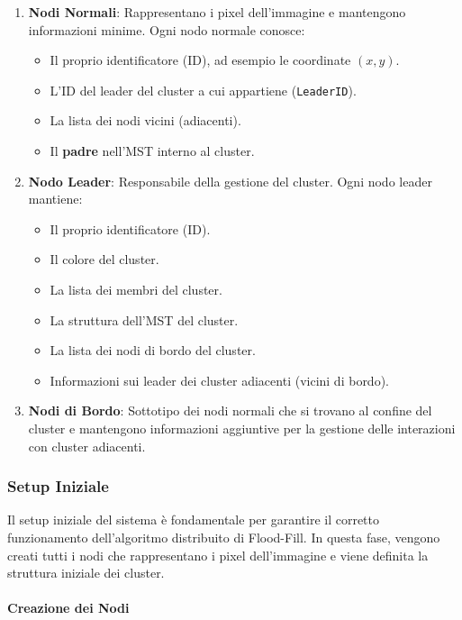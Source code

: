 \documentclass[12pt, a4paper]{report}
\begin{document}
\begin{enumerate}
    \item \textbf{Nodi Normali}: Rappresentano i pixel dell'immagine e mantengono informazioni minime. Ogni nodo normale conosce:
    \begin{itemize}
        \item Il proprio identificatore (ID), ad esempio le coordinate $(x, y)$.
        \item L'ID del leader del cluster a cui appartiene (\texttt{LeaderID}).
        \item La lista dei nodi vicini (adiacenti).
        \item Il \textbf{padre} nell'MST interno al cluster.
    \end{itemize}
    \item \textbf{Nodo Leader}: Responsabile della gestione del cluster. Ogni nodo leader mantiene:
    \begin{itemize}
        \item Il proprio identificatore (ID).
        \item Il colore del cluster.
        \item La lista dei membri del cluster.
        \item La struttura dell'MST del cluster.
        \item La lista dei nodi di bordo del cluster.
        \item Informazioni sui leader dei cluster adiacenti (vicini di bordo).
    \end{itemize}
    \item \textbf{Nodi di Bordo}: Sottotipo dei nodi normali che si trovano al confine del cluster e mantengono informazioni aggiuntive per la gestione delle interazioni con cluster adiacenti.
\end{enumerate}


\subsubsection{Setup Iniziale}

Il setup iniziale del sistema è fondamentale per garantire il corretto funzionamento dell'algoritmo distribuito di Flood-Fill. In questa fase, vengono creati tutti i nodi che rappresentano i pixel dell'immagine e viene definita la struttura iniziale dei cluster.

\paragraph{Creazione dei Nodi}
\end{document}

